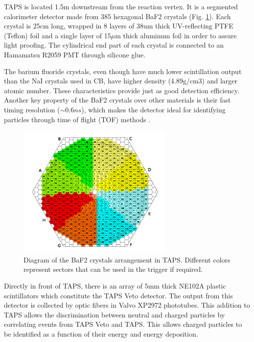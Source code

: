 \indent TAPS is located 1.5m downstream from the reaction vertex. It is a segmented calorimeter detector made from 385 hexagonal BaF2 crystals (Fig. \ref{taps}). Each crystal is  25cm long,  wrapped in  8  layers  of 38um thick  UV-reflecting PTFE (Teflon) foil and a single layer of 15$\mu$m thick aluminum foil in order to assure light proofing. The cylindrical end part of each crystal is connected to an Hamamatsu R2059 PMT through silicone glue.

\indent The barium fluoride crystals, even though have much lower scintillation output than the NaI crystals used in CB, have higher density (4.89g/cm3) and larger atomic number. These characteristics provide just as good detection efficiency. Another key property of the BaF2 crystals over other materials is their fast timing resolution ($\sim 0.6ns$), which makes the detector ideal for identifying particles through time of flight (TOF) methods \cite{novotny}.


\begin{figure}[H]
\begin{center}
\includegraphics[scale=1.4]{pictures/png/taps.png}
\caption{Diagram of the BaF2 crystals arrangement in TAPS. Different colors represent sectors that can be used in the trigger if required.}
\label{taps}
\end{center}
\end{figure} 

\indent Directly  in  front  of  TAPS,  there  is  an  array  of  5mm  thick  NE102A  plastic scintillators which constitute the TAPS Veto detector. The output from this detector is collected by optic fibers in Valvo XP2972 phototubes. This addition to TAPS allows the discrimination between neutral and charged particles by correlating events from TAPS Veto and TAPS. This allows charged particles to be identified as a function of their energy and energy deposition.

